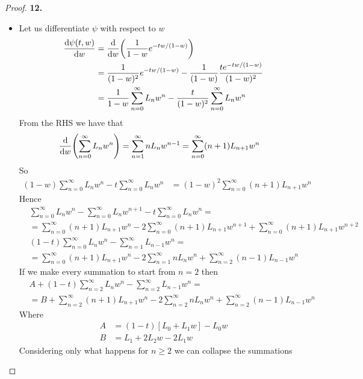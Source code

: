 \documentclass[11pt]{article}
\theoremstyle{definition}
\begin{document}
\cleardoublepage
\begin{proof}{\textbf{12.}}\\
\begin{itemize}
\item [(a)] Let us differentiate $\psi$ with respect to $w$
\begin{align*}
    \dv{\psi(t,w)}{w} &= \dv{w}(\frac{1}{1 - w}e^{-tw/(1-w)})\\
    &= \frac{1}{(1 - w)^2}e^{-tw/(1-w)}
    - \frac{1}{(1-w)}\frac{te^{-tw/(1-w)}}{(1 - w)^2}\\
    &= \frac{1}{1-w}\sum_{n=0}^\infty L_n w^n
    - \frac{t}{(1-w)^2}\sum_{n=0}^\infty L_{n} w^n
\end{align*}
From the RHS we have that
\begin{align*}
    \dv{w}(\sum_{n=0}^\infty L_n w^n) &= \sum_{n=1}^\infty n L_n w^{n-1}
    = \sum_{n=0}^\infty (n + 1) L_{n + 1} w^{n}
\end{align*}
So
\begin{align*}
    (1 - w)\sum_{n=0}^\infty L_n w^n
    - t\sum_{n=0}^\infty L_{n} w^n
    &= (1 - w)^2\sum_{n=0}^\infty (n + 1) L_{n + 1} w^{n}
\end{align*}
Hence
\begin{align*}
    &\sum_{n=0}^\infty L_n w^n - \sum_{n=0}^\infty L_n w^{n+1}
    - t\sum_{n=0}^\infty L_{n} w^n
    =\\
    &= \sum_{n=0}^\infty (n + 1) L_{n + 1} w^{n}
    -2\sum_{n=0}^\infty (n + 1) L_{n + 1} w^{n+1}
    +\sum_{n=0}^\infty (n + 1) L_{n + 1} w^{n+2}\\[6pt]
    &(1 - t)\sum_{n=0}^\infty L_{n} w^n
    - \sum_{n=1}^\infty L_{n-1} w^{n}
    =\\
    &= \sum_{n=0}^\infty (n + 1) L_{n + 1} w^{n}
    -2\sum_{n=1}^\infty nL_{n} w^{n}
    +\sum_{n=2}^\infty (n - 1) L_{n-1} w^{n}
\end{align*}
If we make every summation to start from $n=2$ then 
\begin{align*}
    &A + (1 - t)\sum_{n=2}^\infty L_{n} w^n
    - \sum_{n=2}^\infty L_{n-1} w^{n}
    =\\
    &= B + \sum_{n=2}^\infty (n + 1) L_{n + 1} w^{n}
    -2\sum_{n=2}^\infty nL_{n} w^{n}
    +\sum_{n=2}^\infty (n - 1) L_{n-1} w^{n}
\end{align*}
Where
\begin{align*}
    A &= (1 - t)[L_0 + L_1w] - L_0w\\
    B &= L_1 + 2L_2w - 2L_1w
\end{align*}
Considering only what happens for $n \geq 2$ we can collapse the summations

\end{itemize}
\end{proof}
\end{document}

